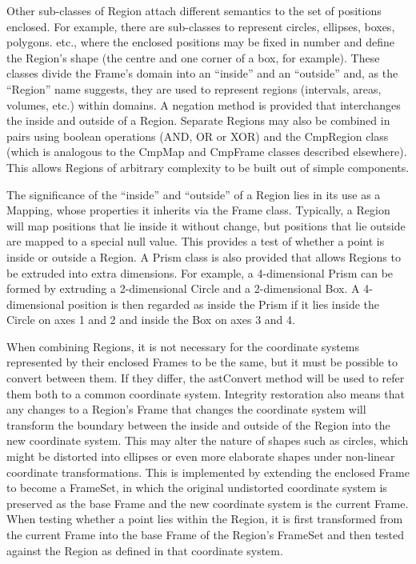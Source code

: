 \documentclass[final,authoryear,5p,times,twocolumn]{elsarticle}
\begin{document}
Other sub-classes of Region attach different semantics to the set of
positions enclosed. For example, there are sub-classes to represent
circles, ellipses, boxes, polygons. etc., where the enclosed positions
may be fixed in number and define the Region's shape (the centre and one
corner of a box, for example). These classes divide the Frame's domain
into an ``inside'' and an ``outside'' and, as the ``Region'' name suggests,
they are used to represent regions (intervals, areas, volumes, etc.)
within domains. A negation method is provided that interchanges the
inside and outside of a Region. Separate Regions may also be combined in
pairs using boolean operations (AND, OR or XOR) and the CmpRegion class
(which is analogous to the CmpMap and CmpFrame classes described
elsewhere). This allows Regions of arbitrary complexity to be built out
of simple components.

The significance of the ``inside'' and ``outside'' of a Region lies in its
use as a Mapping, whose properties it inherits via the Frame class.
Typically, a Region will map positions that lie inside it without change,
but positions that lie outside are mapped to a special null value. This
provides a test of whether a point is inside or outside a Region. A Prism
class is also provided that allows Regions to be extruded into extra
dimensions. For example, a 4-dimensional Prism can be formed by extruding
a 2-dimensional Circle and a 2-dimensional Box. A 4-dimensional position
is then regarded as inside the Prism if it lies inside the Circle on axes
1 and 2 and inside the Box on axes 3 and 4.

When combining Regions, it is not necessary for the coordinate systems
represented by their enclosed Frames to be the same, but it must be
possible to convert between them. If they differ, the astConvert method
will be used to refer them both to a common coordinate system. Integrity
restoration also means that any changes to a Region's Frame that changes
the coordinate system will transform the boundary between the inside and
outside of the Region into the new coordinate system. This may alter the
nature of shapes such as circles, which might be distorted into ellipses
or even more elaborate shapes under non-linear coordinate
transformations. This is implemented by extending the enclosed Frame to
become a FrameSet, in which the original undistorted coordinate system is
preserved as the base Frame and the new coordinate system is the current
Frame. When testing whether a point lies within the Region, it is first
transformed from the current Frame into the base Frame of the Region's
FrameSet and then tested against the Region as defined in that coordinate
system.
\end{document}
